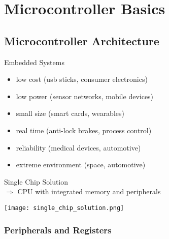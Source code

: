 \section{Microcontroller Basics}

\subsection{Microcontroller Architecture}


\begin{theorem}{Embedded Systems}
    \begin{itemize}
        \item low cost (usb sticks, consumer electronics)
        \item low power (sensor networks, mobile devices)
        \item small size (smart cards, wearables)
        \item real time (anti-lock brakes, process control)
        \item reliability (medical devices, automotive)
        \item extreme environment (space, automotive)
    \end{itemize}
\end{theorem}

\begin{concept}{Single Chip Solution} \\
    $\Rightarrow$ CPU with integrated memory and peripherals
\end{concept}

\texttt{[image: single\_chip\_solution.png]}

\multend

\subsubsection{Peripherals and Registers}

